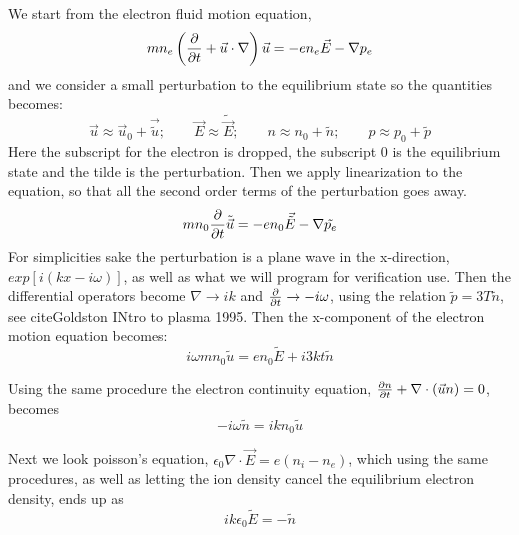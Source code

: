 	We start from the electron fluid motion equation,
	\begin{equation}
	mn_e \left( \pdv{}{t} + \vec{u} \cdot \nabla \right)\vec{u} = -en_e\vec{E} - \nabla p_e
	\end{equation}
	and we consider a small perturbation to the equilibrium state so the quantities becomes:
	\begin{equation}
	\vec{u} \approx \vec{u}_0 + \vec{\tilde{u}}; \qquad{}
	\vec{E} \approx \tilde{\vec{E}}; \qquad{}
	n \approx n_0 + \tilde{n};\qquad{}
	p \approx p_0 + \tilde {p}
	\end{equation}
	Here the subscript for the electron is dropped, the subscript \(0\) is
 	the equilibrium state and the tilde is the perturbation. Then we apply
	linearization to the equation, so that all the second order terms of the
	perturbation goes away.
	\begin{equation}
	mn_0\pdv{}{t} \tilde{\vec{u}} = -en_0\vec{\tilde{E}} - \nabla \tilde{p_e}
	\end{equation}
	For simplicities sake the perturbation is a plane wave in the x-direction, \(exp[i(kx - i\omega)]\),
	as well as what we will program for verification use. Then the differential
	operators become \(\nabla \rightarrow ik\) and \(\pdv{}{t} \rightarrow -i\omega\),
	using the relation \(\tilde{p} = {3T\tilde{n}}\), see cite{Goldston INtro to plasma 1995}.
	Then the x-component of the electron motion equation becomes:
	\begin{equation}
	i\omega mn_0 \tilde{u} = e n_0 \tilde{E} + i 3 kt\tilde{n}
	\end{equation}

	Using the same procedure the electron continuity equation,
	\(\pdv{n}{t} + \nabla \cdot (\vec{u} n) = 0 \), becomes
	\begin{equation}
		-i\omega \tilde{n} = ikn_0 \tilde{u}
	\end{equation}

	Next we look poisson's equation, \(\epsilon_0 \nabla \cdot \vec{E} = e(n_i-n_e) \), which using the same procedures,
	as well as letting the ion density cancel the equilibrium electron density,	ends up as
	\begin{equation}
		ik\epsilon_0\tilde{E} = -\tilde{n}
	\end{equation}
